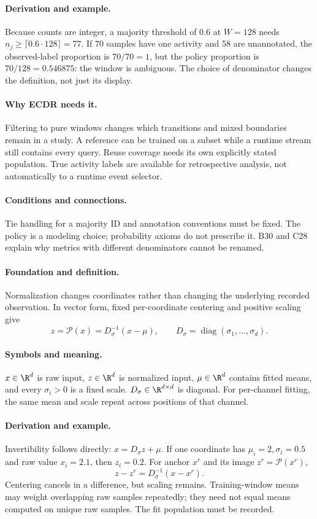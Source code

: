 \paragraph{Derivation and example.}
Because counts are integer, a majority threshold of 0.6 at $W=128$ needs
$n_j\ge\lceil0.6\cdot128\rceil=77$. If 70 samples have one activity and
58 are unannotated, the observed-label proportion is $70/70=1$, but the
policy proportion is $70/128=0.546875$: the window is ambiguous. The
choice of denominator changes the definition, not just its display.
\paragraph{Why ECDR needs it.}
Filtering to pure windows changes which transitions and mixed boundaries
remain in a study. A reference can be trained on a subset while a runtime
stream still contains every query. Reuse coverage needs its own explicitly
stated population. True activity labels are available for retrospective
analysis, not automatically to a runtime event selector.
\paragraph{Conditions and connections.}
Tie handling for a majority ID and annotation conventions must be fixed.
The policy is a modeling choice; probability axioms do not prescribe it.
B30 and C28 explain why metrics with different denominators cannot be renamed.

\paragraph{Foundation and definition.}
Normalization changes coordinates rather than changing the underlying
recorded observation. In vector form, fixed per-coordinate centering and
positive scaling give
\[
 z=\mathcal P(x)=D_\sigma^{-1}(x-\mu),\qquad
 D_\sigma=\operatorname{diag}(\sigma_1,\ldots,\sigma_d).
\]
\paragraph{Symbols and meaning.}
$x\in\R^d$ is raw input, $z\in\R^d$ is normalized input,
$\mu\in\R^d$ contains fitted means, and every $\sigma_i>0$ is a fixed
scale. $D_\sigma\in\R^{d\times d}$ is diagonal. For per-channel fitting,
the same mean and scale repeat across positions of that channel.
\paragraph{Derivation and example.}
Invertibility follows directly: $x=D_\sigma z+\mu$. If one coordinate has
$\mu_i=2,\sigma_i=0.5$ and raw value $x_i=2.1$, then $z_i=0.2$.
For anchor $x^r$ and its image $z^r=\mathcal P(x^r)$,
\[
 z-z^r=D_\sigma^{-1}(x-x^r).
\]
Centering cancels in a difference, but scaling remains. Training-window
means may weight overlapping raw samples repeatedly; they need not equal
means computed on unique raw samples. The fit population must be recorded.
